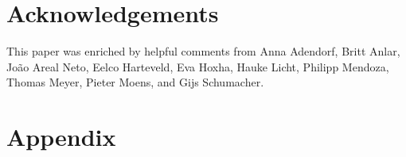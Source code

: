 \documentclass{article}
\begin{document}
\section*{Acknowledgements}
This paper was enriched by helpful comments from Anna Adendorf, Britt Anlar, João Areal Neto, Eelco Harteveld, Eva Hoxha, Hauke Licht, Philipp Mendoza, Thomas Meyer, Pieter Moens, and Gijs Schumacher.


\printbibliography

\newpage

\section*{Appendix}


\end{document}

